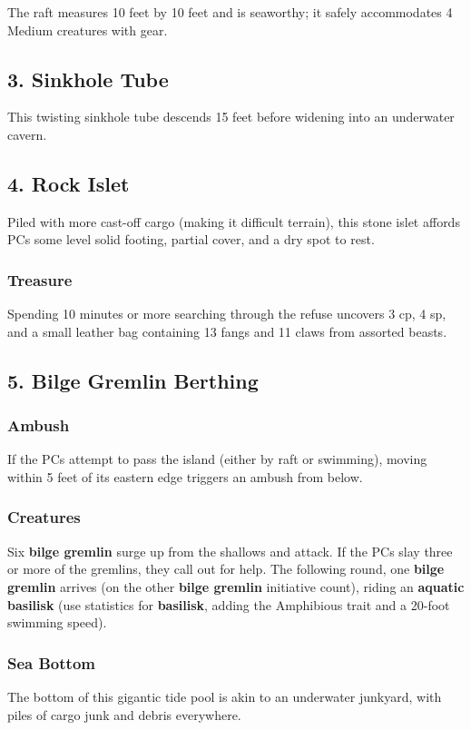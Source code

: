\documentclass[10pt,a4paper,twoside,bg=print,twocolumn,openany,nodeprecatedcode]{dndbook}
\begin{document}
The raft measures 10 feet by 10 feet and is seaworthy; it safely accommodates 4 Medium creatures with gear.

\subsection{3. Sinkhole Tube}
This twisting sinkhole tube descends 15 feet before widening into an underwater cavern.

\subsection{4. Rock Islet}
Piled with more cast-off cargo (making it difficult terrain), this stone islet affords PCs some level solid footing, partial cover, and a dry spot to rest.

\subsubsection{Treasure}
Spending 10 minutes or more searching through the refuse uncovers 3 cp, 4 sp, and a small leather bag containing 13 fangs and 11 claws from assorted beasts.

\subsection{5. Bilge Gremlin Berthing}
\subsubsection{Ambush}
If the PCs attempt to pass the island (either by raft or swimming), moving within 5 feet of its eastern edge triggers an ambush from below.

\subsubsection{Creatures}
Six \textbf{bilge gremlin} surge up from the shallows and attack. If the PCs slay three or more of the gremlins, they call out for help. The following round, one \textbf{bilge gremlin} arrives (on the other \textbf{bilge gremlin} initiative count), riding an \textbf{aquatic basilisk} (use statistics for \textbf{basilisk}, adding the Amphibious trait and a 20-foot swimming speed).

\subsubsection{Sea Bottom}
The bottom of this gigantic tide pool is akin to an underwater junkyard, with piles of cargo junk and debris everywhere.
\end{document}
